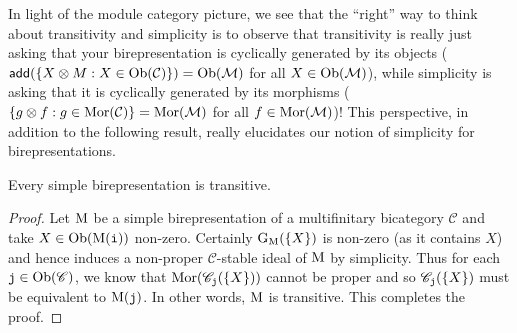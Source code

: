 \noindent In light of the module category picture, we see that the ``right'' way to think about transitivity and simplicity is to observe that transitivity is really just asking that your birepresentation is cyclically generated by its objects ($\textsf{add}(\{X \otimes M : X \in \textnormal{Ob}(\mathcal{C})\}) = \textnormal{Ob}(\mathcal{M})$ for all $X \in \textnormal{Ob}(\mathcal{M})$), while simplicity is asking that it is cyclically generated by its morphisms ($\{g \otimes f : g \in \textnormal{Mor}(\mathcal{C})\} = \textnormal{Mor}(\mathcal{M})$ for all $f \in \textnormal{Mor}(\mathcal{M})$)! This perspective, in addition to the following result, really elucidates our notion of simplicity for birepresentations.\newpage


\noindent\begin{proposition} Every simple birepresentation is transitive.\\
\end{proposition}

\noindent\begin{proof} %
Let $\textnormal{M}$ be a simple birepresentation of a multifinitary bicategory $\mathscr{C}$ and take $X \in \textnormal{Ob}(\textnormal{M}(\textnormal{\texttt{i}}))$ non-zero. Certainly $\textnormal{G}_\textnormal{M}(\{X\})$ is non-zero (as it contains $X$) and hence induces a non-proper $\mathscr{C}$-stable ideal of $\textnormal{M}$ by simplicity. Thus for each $\textnormal{\texttt{j}} \in \textnormal{Ob}(\mathscr{C})$, we know that $\textnormal{Mor}(\mathscr{C}_{\textnormal{\texttt{j}}}(\{X\}))$ cannot be proper and so $\mathscr{C}_{\textnormal{\texttt{j}}}(\{X\})$ must be equivalent to $\textnormal{M}(\textnormal{\texttt{j}})$. In other words, $\textnormal{M}$ is transitive. This completes the proof.
\end{proof}\\

